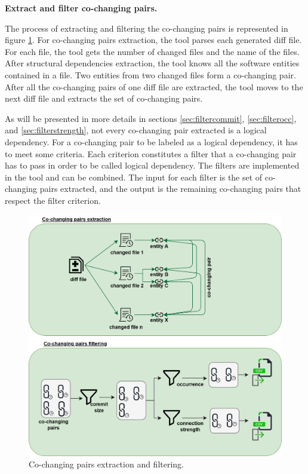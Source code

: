 \documentclass[12pt, a4paper, twoside]{report}
\begin{document}
\textbf{Extract and filter co-changing pairs.}

The process of extracting and filtering the co-changing pairs is represented in figure \ref{fig:figfiltering}.
For co-changing pairs extraction, the tool parses each generated diff file.
For each file, the tool gets the number of changed files and the name of the files. 
After structural dependencies extraction, the tool knows all the software entities contained in a file. Two entities from two changed files form a co-changing pair. After all the co-changing pairs of one diff file are extracted, the tool moves to the next diff file and extracts the set of co-changing pairs.

As will be presented in more details in sections \ref{sec:filtercommit}, \ref{sec:filterocc}, and \ref{sec:filterstrength}, not every co-changing pair extracted is a logical dependency. For a co-changing pair to be labeled as a logical dependency, it has to meet some criteria. Each criterion constitutes a filter that a co-changing pair has to pass in order to be called logical dependency.
The filters are implemented in the tool and can be combined. The input for each filter is the set of co-changing pairs extracted, and the output is the remaining co-changing pairs that respect the filter criterion.


\begin{figure}[H]
\centering
\includegraphics[width=\textwidth]{pairs_filtering.png}
\caption{Co-changing pairs extraction and filtering.}
\label{fig:figfiltering}
\end{figure}
\end{document}
